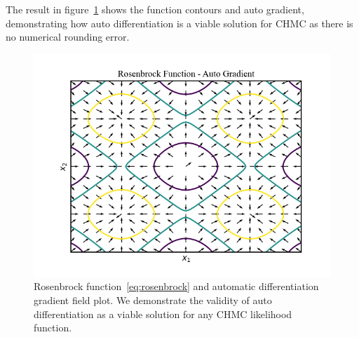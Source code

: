 \documentclass[11pt]{article}
\begin{document}
    The result in figure~\ref{fig:rosenbrock} shows the function contours and auto gradient, demonstrating how auto
    differentiation is a viable solution for CHMC as there is no numerical rounding error.
    \begin{figure}[h!]
        \center
        \includegraphics[width=\linewidth]{../figures/RosenbrockAutodiff}
        \caption{
            Rosenbrock function~\eqref{eq:rosenbrock} and automatic differentiation gradient field plot.
            We demonstrate the validity of auto differentiation as a viable solution for any CHMC likelihood function.
        }\label{fig:rosenbrock}
    \end{figure}
\end{document}

